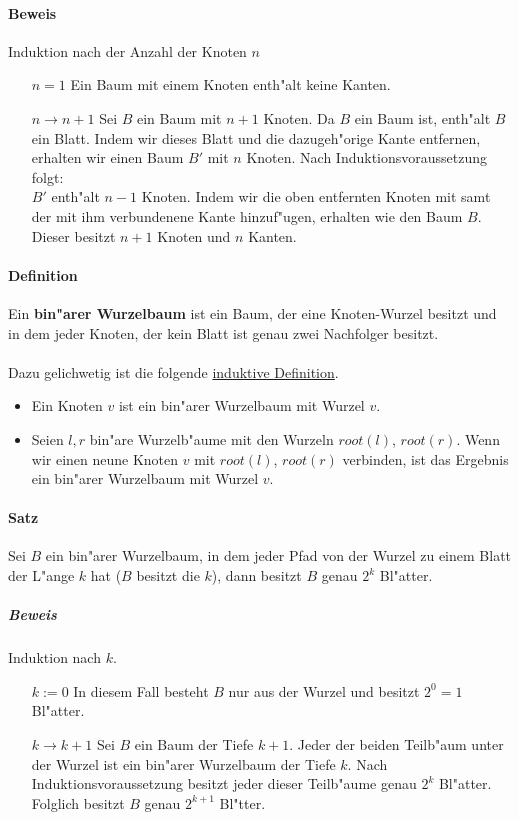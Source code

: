 \paragraph{Beweis} Induktion nach der Anzahl der Knoten $n$
\begin{itemize}
    \item[$n=1$] Ein Baum mit einem Knoten enth"alt keine Kanten.
    \item[$n\rightarrow n+1$] Sei $B$ ein Baum mit $n+1$ Knoten. Da $B$ ein Baum ist, enth"alt $B$ ein Blatt.
                              Indem wir dieses Blatt und die dazugeh"orige Kante entfernen, erhalten wir einen
                              Baum $B'$ mit $n$ Knoten. Nach Induktionsvoraussetzung folgt:\\
                              $B'$ enth"alt $n-1$ Knoten. Indem wir die oben entfernten Knoten mit samt der mit
                              ihm verbundenene Kante hinzuf"ugen, erhalten wie den Baum $B$. Dieser besitzt $n+1$
                              Knoten und $n$ Kanten.
\end{itemize}

\paragraph{Definition} \parskp
Ein \textbf{bin"arer Wurzelbaum} ist ein Baum, der eine Knoten-Wurzel besitzt und in dem jeder Knoten, der
kein Blatt ist genau zwei Nachfolger besitzt.\\
\\
Dazu gelichwetig ist die folgende \underline{induktive Definition}.
\begin{itemize}
    \item Ein Knoten $v$ ist ein bin"arer Wurzelbaum mit Wurzel $v$.
    \item Seien $l,r$ bin"are Wurzelb"aume mit den Wurzeln $root(l)$, $root(r)$. Wenn wir einen neune
          Knoten $v$ mit $root(l)$, $root(r)$ verbinden, ist das Ergebnis ein bin"arer Wurzelbaum mit
          Wurzel $v$.
\end{itemize}

\paragraph{Satz} \parskp
Sei $B$ ein bin"arer Wurzelbaum, in dem jeder Pfad von der Wurzel zu einem Blatt der L"ange $k$ hat
($B$ besitzt die $k$), dann besitzt $B$ genau $2^k$ Bl"atter. %

\subparagraph{Beweis} Induktion nach $k$.
\begin{itemize}
    \item[$k:=0$] In diesem Fall besteht $B$ nur aus der Wurzel und besitzt $2^0=1$ Bl"atter.
    \item[$k\rightarrow k+1$] Sei $B$ ein Baum der Tiefe $k+1$. Jeder der beiden Teilb"aum unter der Wurzel
                            ist ein bin"arer Wurzelbaum der Tiefe $k$. Nach Induktionsvoraussetzung besitzt
                            jeder dieser Teilb"aume genau $2^k$ Bl"atter. Folglich besitzt $B$ genau
                            $2^{k+1}$ Bl"tter.
\end{itemize}

